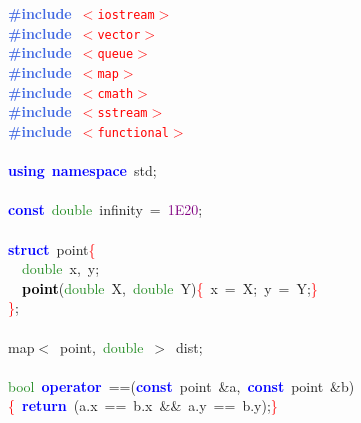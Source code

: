 \noindent
\mbox{}\textbf{\textcolor{RoyalBlue}{\#include}}\ \texttt{\textcolor{Red}{$<$iostream$>$}} \\
\mbox{}\textbf{\textcolor{RoyalBlue}{\#include}}\ \texttt{\textcolor{Red}{$<$vector$>$}} \\
\mbox{}\textbf{\textcolor{RoyalBlue}{\#include}}\ \texttt{\textcolor{Red}{$<$queue$>$}} \\
\mbox{}\textbf{\textcolor{RoyalBlue}{\#include}}\ \texttt{\textcolor{Red}{$<$map$>$}} \\
\mbox{}\textbf{\textcolor{RoyalBlue}{\#include}}\ \texttt{\textcolor{Red}{$<$cmath$>$}} \\
\mbox{}\textbf{\textcolor{RoyalBlue}{\#include}}\ \texttt{\textcolor{Red}{$<$sstream$>$}} \\
\mbox{}\textbf{\textcolor{RoyalBlue}{\#include}}\ \texttt{\textcolor{Red}{$<$functional$>$}} \\
\mbox{} \\
\mbox{}\textbf{\textcolor{Blue}{using}}\ \textbf{\textcolor{Blue}{namespace}}\ std\textcolor{BrickRed}{;} \\
\mbox{} \\
\mbox{}\textbf{\textcolor{Blue}{const}}\ \textcolor{ForestGreen}{double}\ infinity\ \textcolor{BrickRed}{=}\ \textcolor{Purple}{1E20}\textcolor{BrickRed}{;} \\
\mbox{} \\
\mbox{}\textbf{\textcolor{Blue}{struct}}\ point\textcolor{Red}{\{} \\
\mbox{}\ \ \textcolor{ForestGreen}{double}\ x\textcolor{BrickRed}{,}\ y\textcolor{BrickRed}{;} \\
\mbox{}\ \ \textbf{\textcolor{Black}{point}}\textcolor{BrickRed}{(}\textcolor{ForestGreen}{double}\ X\textcolor{BrickRed}{,}\ \textcolor{ForestGreen}{double}\ Y\textcolor{BrickRed}{)}\textcolor{Red}{\{}\ x\ \textcolor{BrickRed}{=}\ X\textcolor{BrickRed}{;}\ y\ \textcolor{BrickRed}{=}\ Y\textcolor{BrickRed}{;}\textcolor{Red}{\}} \\
\mbox{}\textcolor{Red}{\}}\textcolor{BrickRed}{;} \\
\mbox{} \\
\mbox{}map\textcolor{BrickRed}{$<$}\ point\textcolor{BrickRed}{,}\ \textcolor{ForestGreen}{double}\ \textcolor{BrickRed}{$>$}\ dist\textcolor{BrickRed}{;} \\
\mbox{} \\
\mbox{}\textcolor{ForestGreen}{bool}\ \textbf{\textcolor{Blue}{operator}}\ \textcolor{BrickRed}{==(}\textbf{\textcolor{Blue}{const}}\ point\ \textcolor{BrickRed}{\&}a\textcolor{BrickRed}{,}\ \textbf{\textcolor{Blue}{const}}\ point\ \textcolor{BrickRed}{\&}b\textcolor{BrickRed}{)}\textcolor{Red}{\{}\ \textbf{\textcolor{Blue}{return}}\ \textcolor{BrickRed}{(}a\textcolor{BrickRed}{.}x\ \textcolor{BrickRed}{==}\ b\textcolor{BrickRed}{.}x\ \textcolor{BrickRed}{\&\&}\ a\textcolor{BrickRed}{.}y\ \textcolor{BrickRed}{==}\ b\textcolor{BrickRed}{.}y\textcolor{BrickRed}{);}\textcolor{Red}{\}} \\
